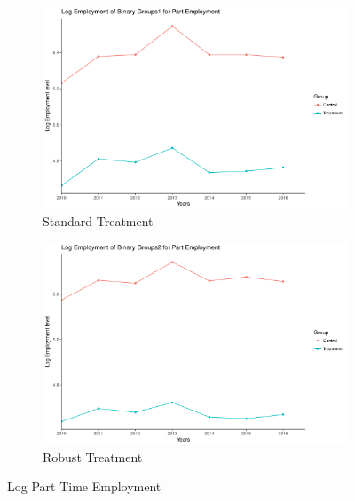 \documentclass[a4paper]{article}
\begin{document}
{\begin{figure}
\begin{subfigure}[h]{0.5\linewidth}
\includegraphics[width=\textwidth]{q6/plot_treatment_t1part.pdf}
\caption{Standard Treatment}
\end{subfigure}
\hfill
\begin{subfigure}[h]{0.5\linewidth}
\includegraphics[width=\textwidth]{q6/plot_treatment_ta2part.pdf}
\caption{Robust Treatment}
\end{subfigure}%
\caption{Log Part Time Employment}
\label{q6p}
\end{figure}

}
\end{document}
